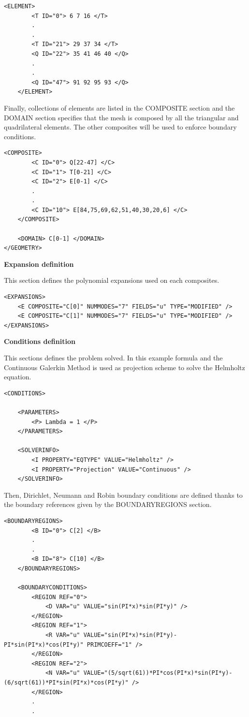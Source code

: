 \begin{lstlisting}[style=XMLStyle]
<ELEMENT>
        <T ID="0"> 6 7 16 </T>
        .
        .
        <T ID="21"> 29 37 34 </T>
        <Q ID="22"> 35 41 46 40 </Q>
        .
        .
        <Q ID="47"> 91 92 95 93 </Q>
    </ELEMENT>
\end{lstlisting}

Finally, collections of elements are listed in the COMPOSITE section and the DOMAIN section specifies that 
the mesh is composed by all the triangular and quadrilateral elements. The other composites will be used to enforce boundary conditions.

\begin{lstlisting}[style=XMLStyle]
 <COMPOSITE>
        <C ID="0"> Q[22-47] </C>
        <C ID="1"> T[0-21] </C>
        <C ID="2"> E[0-1] </C>
        .
        .
        <C ID="10"> E[84,75,69,62,51,40,30,20,6] </C>
    </COMPOSITE>

    <DOMAIN> C[0-1] </DOMAIN>
</GEOMETRY>
\end{lstlisting}

\textbf{\footnotesize{Expansion definition}}

This section defines the polynomial expansions used on each composites.

\begin{lstlisting}[style=XMLStyle]
<EXPANSIONS>
    <E COMPOSITE="C[0]" NUMMODES="7" FIELDS="u" TYPE="MODIFIED" />
    <E COMPOSITE="C[1]" NUMMODES="7" FIELDS="u" TYPE="MODIFIED" />
</EXPANSIONS>
\end{lstlisting}

\textbf{\footnotesize{Conditions definition}}

This sections defines the problem solved. In this example formula and the Continuous Galerkin Method
is used as projection scheme to solve the Helmholtz equation.

\begin{lstlisting}[style=XMLStyle]
<CONDITIONS>

    <PARAMETERS>
        <P> Lambda = 1 </P>
    </PARAMETERS>

    <SOLVERINFO>
        <I PROPERTY="EQTYPE" VALUE="Helmholtz" />
        <I PROPERTY="Projection" VALUE="Continuous" />
    </SOLVERINFO>
\end{lstlisting}

Then, Dirichlet, Neumann and Robin boundary conditions are defined thanks to 
the boundary references given by the BOUNDARYREGIONS section.

\begin{lstlisting}[style=XMLStyle]
<BOUNDARYREGIONS>
        <B ID="0"> C[2] </B>
        .
        .
        <B ID="8"> C[10] </B>
    </BOUNDARYREGIONS>

    <BOUNDARYCONDITIONS>
        <REGION REF="0">
            <D VAR="u" VALUE="sin(PI*x)*sin(PI*y)" />
        </REGION>
        <REGION REF="1">
            <R VAR="u" VALUE="sin(PI*x)*sin(PI*y)-PI*sin(PI*x)*cos(PI*y)" PRIMCOEFF="1" />
        </REGION>
        <REGION REF="2">
            <N VAR="u" VALUE="(5/sqrt(61))*PI*cos(PI*x)*sin(PI*y)-(6/sqrt(61))*PI*sin(PI*x)*cos(PI*y)" />
        </REGION>
        .
        .
\end{lstlisting}

